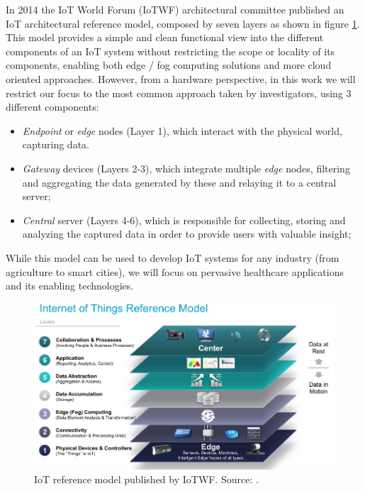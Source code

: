 In 2014 the \acs{IoT} World Forum (IoTWF) architectural committee published an \acs{IoT} architectural reference model, composed by seven layers as shown in figure \ref{fig:iotwf-referencemodel}. This model provides a simple and clean functional view into the different components of an \acs{IoT} system without restricting the scope or locality of its components, enabling both edge / fog computing solutions and more cloud oriented approaches. However, from a hardware perspective, in this work we will restrict our focus to the most common approach taken by investigators, using 3 different components: 


\begin{itemize}
    \item \textit{Endpoint} or \textit{edge} nodes (Layer 1), which interact with the physical world, capturing data.
    \item \textit{Gateway} devices (Layers 2-3), which integrate multiple \textit{edge} nodes, filtering and aggregating the data generated by these and relaying it to a central server; 
    \item \textit{Central} server (Layers 4-6), which is responsible for collecting, storing and analyzing the captured data in order to provide users with valuable insight;
\end{itemize}


While this model can be used to develop IoT systems for any industry (from agriculture to smart cities), we will focus on pervasive healthcare applications and its enabling technologies. 


\begin{figure}[H]
    \centering
    \includegraphics[width=0.85\linewidth]{images/iotwf-referencemodel.png}
    \caption[IoT reference model published by IoTWF.]{IoT reference model published by IoTWF. Source: \cite{Cisco2014}.}
    \label{fig:iotwf-referencemodel}
\end{figure}

